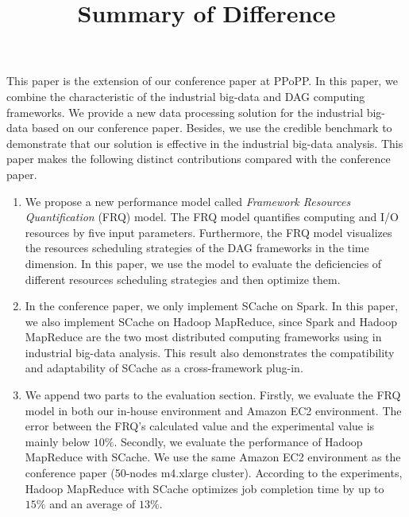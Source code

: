 \documentclass[12pt,reqno]{amsart}
\title{Summary of Difference}
\theoremstyle{plain}
\numberwithin{equation}{section}
\theoremstyle{plain}
\numberwithin{equation}{section}
\begin{document}
\maketitle



This paper is the extension of our conference paper at PPoPP. 
In this paper, we combine the characteristic of the industrial big-data and DAG computing frameworks.
We provide a new data processing solution for the industrial big-data based on our conference paper.
Besides, we use the credible benchmark to demonstrate that our solution is effective in the industrial big-data analysis.
This paper makes the following distinct contributions compared with the conference paper.

\begin{enumerate}
\item 
We propose a new performance model called \textit{Framework Resources Quantification} (FRQ) model.
The FRQ model quantifies computing and I/O resources by five input parameters. 
Furthermore, the FRQ model visualizes the resources scheduling strategies of the DAG frameworks in the time dimension. 
In this paper, we use the model to evaluate the deficiencies of different resources scheduling strategies and then optimize them.
\item 
In the conference paper, we only implement SCache on Spark. 
In this paper, we also implement SCache on Hadoop MapReduce, since Spark and Hadoop MapReduce are the two most distributed computing frameworks using in industrial big-data analysis.
This result also demonstrates the compatibility and adaptability of SCache as a cross-framework plug-in.
\item
We append two parts to the evaluation section. 
Firstly, we evaluate the FRQ model in both our in-house environment and Amazon EC2 environment. The error between the FRQ’s calculated value and the experimental value is mainly below $10\%$. 
Secondly, we evaluate the performance of Hadoop MapReduce with SCache. We use the same Amazon EC2 environment as the conference paper (50-nodes m4.xlarge cluster).
According to the experiments, Hadoop MapReduce with SCache optimizes job completion time by up to $15\%$ and an average of $13\%$.
\end{enumerate}
\end{document}
